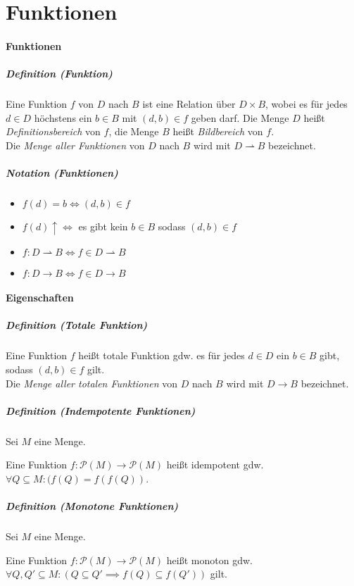 \documentclass[a4paper, 11pt, accentcolor = tud3b]{tudreport}
\newcommand{\definition}[2]{\subparagraph{Definition (#1)} #2}
\newcommand{\notation}[2]{\subparagraph{Notation (#1)} #2}
\begin{document}
    	\section{Funktionen}
		    \paragraph{Funktionen}
			    \definition{Funktion}{
				    Eine Funktion $ f $ von $ D $ nach $ B $ ist eine Relation über $ D \times B $, wobei es für jedes $ d \in D $ höchstens ein $ b \in B $ mit $ (d, b) \in f $ geben darf. Die Menge $ D $ heißt \textit{Definitionsbereich} von $ f $, die Menge $ B $ heißt \textit{Bildbereich} von $ f $. \\
				    Die \textit{Menge aller Funktionen} von $ D $ nach $ B $ wird mit $ D \rightharpoonup B $ bezeichnet.
				}
			    
			    \notation{Funktionen}{
				    \begin{itemize}
				    	\item $ f(d) = b \iff (d, b) \in f $
				    	\item $ f(d) \uparrow \iff $ es gibt kein $ b \in B $ sodass $ (d, b) \in f $
				    	\item $ f : D \rightharpoonup B \iff f \in D \rightharpoonup B $
				    	\item $ f : D \rightarrow B \iff f \in D \rightarrow B $
				    \end{itemize}
				}
		    
		    \paragraph{Eigenschaften}
			    \definition{Totale Funktion}{
				    Eine Funktion $ f $ heißt totale Funktion gdw. es für jedes $ d \in D $ ein $ b \in B $ gibt, sodass $ (d, b) \in f $ gilt. \\
				    Die \textit{Menge aller totalen Funktionen} von $ D $ nach $ B $ wird mit $ D \rightarrow B $ bezeichnet.
				}
				
				\definition{Indempotente Funktionen}{
					Sei $ M $ eine Menge.
					
					Eine Funktion $ f : \mathcal{P}(M) \rightarrow \mathcal{P}(M) $ heißt idempotent gdw. $ \forall Q \subseteq M : (f(Q) = f(f(Q)) $.
				}
				
				\definition{Monotone Funktionen}{
					Sei $ M $ eine Menge.
					
					Eine Funktion $ f : \mathcal{P}(M) \rightarrow \mathcal{P}(M) $ heißt monoton gdw. $ \forall Q, Q' \subseteq M : (Q \subseteq Q' \implies f(Q) \subseteq f(Q')) $ gilt.
				}
				
\end{document}

